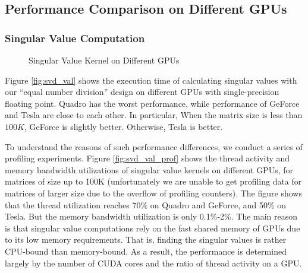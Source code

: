 \vspace{-0.2in}
\subsection{Performance Comparison on Different GPUs}

\subsubsection{Singular Value Computation}
\begin{figure}[hbpt]
\vspace{-0.3in}
\centering
\vspace{-0.1in}
  \caption{Singular Value Kernel on Different GPUs}
  \label{fig:svdval}
\vspace{-0.3in}
\end{figure}

Figure \ref{fig:svd_val} shows the execution time of calculating singular values with our ``equal number division'' design on different GPUs with single-precision floating point.
Quadro has the worst performance, while performance of GeForce and Tesla are close to each other.
In particular, When the matrix size is less than $100K$, GeForce is slightly better. Otherwise, Tesla is better. 

To understand the reasons
of such performance differences, we conduct a series of profiling experiments.
Figure \ref{fig:svd_val_prof} shows the thread activity and memory bandwidth utilizations of singular value kernels on different GPUs, for matrices of size up to 
100K (unfortunately we are unable to get profiling data for matrices of larger size due to the overflow of profiling counters). 
The figure shows that the thread utilization reaches 70\% on Quadro and GeForce, and 50\% on Tesla. 
But the memory bandwidth utilization is only 0.1\%-2\%.
The main reason is that singular value computations rely on the fast shared memory
of GPUs due to its low memory requirements. That is, finding the singular
values is rather CPU-bound than memory-bound. 
As a result, the performance is determined largely by the number of CUDA cores and the ratio of thread activity on a GPU.

